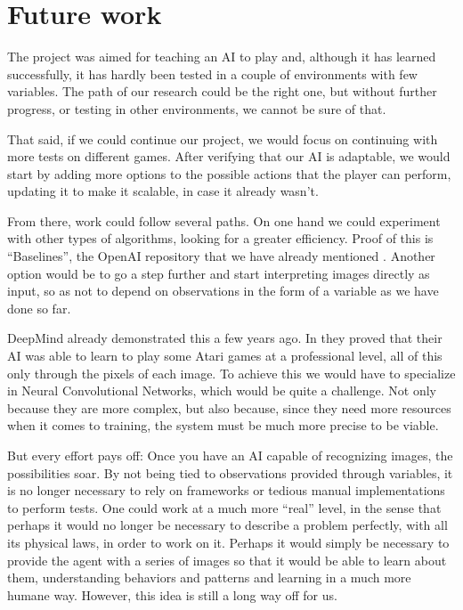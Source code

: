 \section{Future work}

The project was aimed for teaching an AI to play and, although it has learned successfully, it has hardly been tested in a couple of environments with few variables. The path of our research could be the right one, but without further progress, or testing in other environments, we cannot be sure of that.

That said, if we could continue our project, we would focus on continuing with more tests on different games. After verifying that our AI is adaptable, we would start by adding more options to the possible actions that the player can perform, updating it to make it scalable, in case it already wasn't.

From there, work could follow several paths. On one hand we could experiment with other types of algorithms, looking for a greater efficiency. Proof of this is ``Baselines'', the OpenAI repository that we have already mentioned \citep{baselines}. Another option would be to go a step further and start interpreting images directly as input, so as not to depend on observations in the form of a variable as we have done so far.

DeepMind already demonstrated this a few years ago. In \citet{mnih2013playing} they proved that their AI was able to learn to play some Atari games at a professional level, all of this only through the pixels of each image. To achieve this we would have to specialize in Neural Convolutional Networks, which would be quite a challenge. Not only because they are more complex, but also because, since they need more resources when it comes to training, the system must be much more precise to be viable.

But every effort pays off: Once you have an AI capable of recognizing images, the possibilities soar. By not being tied to observations provided through variables, it is no longer necessary to rely on frameworks or tedious manual implementations to perform tests. One could work at a much more ``real'' level, in the sense that perhaps it would no longer be necessary to describe a problem perfectly, with all its physical laws, in order to work on it. Perhaps it would simply be necessary to provide the agent with a series of images so that it would be able to learn about them, understanding behaviors and patterns and learning in a much more humane way. However, this idea is still a long way off for us.
